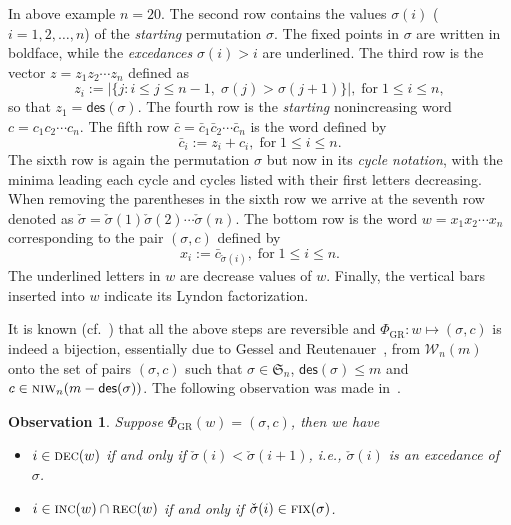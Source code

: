 \documentclass[12pt]{amsart} %
\numberwithin{equation}{section}
\theoremstyle{plain}
\newtheorem{Observation}[theorem]{Observation}
\theoremstyle{definition}
\def\DEC{\hbox{\rm\textsc{dec}}}
\def\INC{\hbox{\rm\textsc{inc}}}
\def\REC{\hbox{\rm\textsc{rec}}}
\def\NIW{\hbox{\rm\textsc{niw}}}
\def\Fix{\hbox{\rm\textsc{fix}}}
\def\des{\mathsf{des}}
\def\S{\mathfrak{S}}
\def\W{\mathcal{W}}
\begin{document}
In above example $n=20$. The second row contains the values $\sigma(i)$ ($i=1,2,\ldots,n$) of the {\em starting} permutation $\sigma$. The fixed points in $\sigma$ are written in boldface, while the {\em excedances} $\sigma(i)>i$  are underlined. The third row is the vector $z=z_1z_2\cdots z_n$ defined as
\begin{equation}\label{def:z-seq}
z_i:=|\{j:i\le j\le n-1,\;\sigma(j)>\sigma(j+1)\}|, \; \text{for}\; 1\le i\le n,
\end{equation}
so that $z_1=\des(\sigma)$. The fourth row is the {\em starting} nonincreasing word $c=c_1c_2\cdots c_n$. The fifth row $\bar{c}=\bar c_1 \bar c_2 \cdots\bar c_n$ is the word defined by
\begin{equation*}
\bar c_i:=z_i+c_i,\; \text{for}\; 1\le i\le n.
\end{equation*}
The sixth row is again the permutation $\sigma$ but now in its {\em cycle notation}, with the minima leading each cycle and cycles listed with their first letters decreasing. When removing the parentheses in the sixth row we arrive at the seventh row denoted as $\check\sigma=\check\sigma(1)\check\sigma(2)\cdots\check\sigma(n)$. The bottom row is the word $w=x_1x_2\cdots x_n$ corresponding to the pair $(\sigma,c)$ defined by 
\begin{equation}\label{eq:w-barc}
x_i:=\bar c_{\check\sigma(i)},\;\text{for}\; 1\le i\le n.
\end{equation}
The underlined letters in $w$ are decrease values of $w$. Finally, the vertical bars inserted into $w$ indicate its Lyndon factorization.

It is known (cf.~\cite{fh,fh3}) that all the above steps are reversible and $\Phi_{\mathrm{GR}}:w\mapsto(\sigma,c)$ is indeed a bijection, essentially due to Gessel and Reutenauer~\cite{ge}, from $\W_n(m)$ onto the set of pairs $(\sigma,c)$ such that $\sigma\in\S_n$, $\des(\sigma)\le m$ and $c\in\NIW_n(m-\des(\sigma))$. The following observation was made in~\cite{fh}.

\goodbreak

\begin{Observation}\label{obser:psi}
Suppose $\Phi_{\mathrm{GR}}(w)=(\sigma,c)$, then we have
\begin{itemize}
	\item[(i)] $i\in\DEC(w)$ if and only if $\check\sigma(i)<\check\sigma(i+1)$, 
	i.e., $\check\sigma(i)$ is an excedance of $\sigma$.
	\item[(ii)] $i\in\INC(w)\cap\REC(w)$ if and only if $\check\sigma(i)\in\Fix(\sigma)$.
\end{itemize}
\end{Observation}
\end{document}
